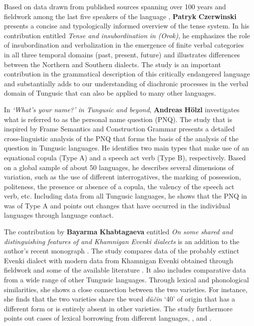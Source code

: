 \documentclass[output=paper,colorlinks,citecolor=brown]{langscibook}
\begin{document}
Based on data drawn from published sources spanning over 100 years and fieldwork among the last five speakers of the  language , \textbf{Patryk} \textbf{Czerwinski} presents a concise and typologically informed overview of the tense system. In his contribution entitled \textit{Tense and insubordination in  (Orok)}, he emphasizes the role of insubordination and verbalization in the emergence of finite verbal categories in all three temporal domains (past, present, future) and illustrates differences between the Northern and Southern dialects. The study is an important contribution in the grammatical description of this critically endangered language and substantially adds to our understanding of diachronic processes in the verbal domain of Tungusic that can also be applied to many other languages.

In \textit{‘What’s your name?’ in Tungusic and beyond}, \textbf{Andreas} \textbf{Hölzl} investigates what is referred to as the personal name question (PNQ). The study that is inspired by Frame Semantics and Construction Grammar presents a detailed cross-linguistic analysis of the PNQ that forms the basis of the analysis of the question in Tungusic languages. He identifies two main types that make use of an equational copula (Type A) and a speech act verb (Type B), respectively. Based on a global sample of about 50 languages, he describes several dimensions of variation, such as the use of different interrogatives, the marking of possession, politeness, the presence or absence of a copula, the valency of the speech act verb, etc. Including data from all Tungusic languages, he shows that the PNQ in  was of Type A and points out changes that have occurred in the individual languages through language contact.

The contribution by \textbf{Bayarma} \textbf{Khabtagaeva} entitled \textit{On some shared and distinguishing features of  and Khamnigan Evenki dialects} is an addition to the author’s recent monograph \citep{Khabtagaeva2017}. The study compares data of the probably extinct  Evenki dialect \citep{Castrén1856} with modern data from Khamnigan Evenki obtained through fieldwork and some of the available literature \citep{Janhunen1991}. It also includes comparative data from a wide range of other Tungusic languages. Through lexical and phonological similarities, she shows a close connection between the two varieties. For instance, she finds that the two varieties share the word \textit{düčin} ‘40’ of  origin that has a different form or is entirely absent in other  varieties. The study furthermore points out cases of lexical borrowing from different  languages, , and .
\end{document}
